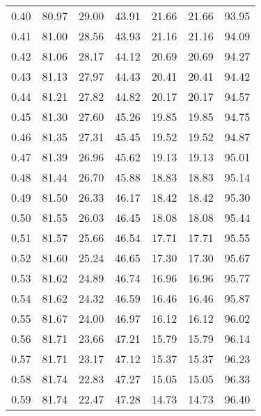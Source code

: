 \begin{tabular}{|c|c|c|c|c|c|c|}
      0.40 &     80.97 &     29.00 &      43.91 &   21.66 &      21.66 &         93.95 \\
      0.41 &     81.00 &     28.56 &      43.93 &   21.16 &      21.16 &         94.09 \\
      0.42 &     81.06 &     28.17 &      44.12 &   20.69 &      20.69 &         94.27 \\
      0.43 &     81.13 &     27.97 &      44.43 &   20.41 &      20.41 &         94.42 \\
      0.44 &     81.21 &     27.82 &      44.82 &   20.17 &      20.17 &         94.57 \\
      0.45 &     81.30 &     27.60 &      45.26 &   19.85 &      19.85 &         94.75 \\
      0.46 &     81.35 &     27.31 &      45.45 &   19.52 &      19.52 &         94.87 \\
      0.47 &     81.39 &     26.96 &      45.62 &   19.13 &      19.13 &         95.01 \\
      0.48 &     81.44 &     26.70 &      45.88 &   18.83 &      18.83 &         95.14 \\
      0.49 &     81.50 &     26.33 &      46.17 &   18.42 &      18.42 &         95.30 \\
      0.50 &     81.55 &     26.03 &      46.45 &   18.08 &      18.08 &         95.44 \\
      0.51 &     81.57 &     25.66 &      46.54 &   17.71 &      17.71 &         95.55 \\
      0.52 &     81.60 &     25.24 &      46.65 &   17.30 &      17.30 &         95.67 \\
      0.53 &     81.62 &     24.89 &      46.74 &   16.96 &      16.96 &         95.77 \\
      0.54 &     81.62 &     24.32 &      46.59 &   16.46 &      16.46 &         95.87 \\
      0.55 &     81.67 &     24.00 &      46.97 &   16.12 &      16.12 &         96.02 \\
      0.56 &     81.71 &     23.66 &      47.21 &   15.79 &      15.79 &         96.14 \\
      0.57 &     81.71 &     23.17 &      47.12 &   15.37 &      15.37 &         96.23 \\
      0.58 &     81.74 &     22.83 &      47.27 &   15.05 &      15.05 &         96.33 \\
      0.59 &     81.74 &     22.47 &      47.28 &   14.73 &      14.73 &         96.40 \\

\end{tabular}
